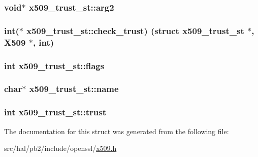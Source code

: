 \subsubsection[{\texorpdfstring{arg2}{arg2}}]{\setlength{\rightskip}{0pt plus 5cm}void$\ast$ x509\+\_\+trust\+\_\+st\+::arg2}\hypertarget{structx509__trust__st_af83753e80804cc408124be78954df1ef}{}\label{structx509__trust__st_af83753e80804cc408124be78954df1ef}
\subsubsection[{\texorpdfstring{check\+\_\+trust}{check_trust}}]{\setlength{\rightskip}{0pt plus 5cm}int($\ast$ x509\+\_\+trust\+\_\+st\+::check\+\_\+trust) (struct {\bf x509\+\_\+trust\+\_\+st} $\ast$, {\bf X509} $\ast$, int)}\hypertarget{structx509__trust__st_a416ceaadc539241699efb993fb2dc707}{}\label{structx509__trust__st_a416ceaadc539241699efb993fb2dc707}
\subsubsection[{\texorpdfstring{flags}{flags}}]{\setlength{\rightskip}{0pt plus 5cm}int x509\+\_\+trust\+\_\+st\+::flags}\hypertarget{structx509__trust__st_aee3ce09b9d6184cd66ad624b5689a676}{}\label{structx509__trust__st_aee3ce09b9d6184cd66ad624b5689a676}
\subsubsection[{\texorpdfstring{name}{name}}]{\setlength{\rightskip}{0pt plus 5cm}char$\ast$ x509\+\_\+trust\+\_\+st\+::name}\hypertarget{structx509__trust__st_a31ddd3f516ef8144ef40285f8f8f304d}{}\label{structx509__trust__st_a31ddd3f516ef8144ef40285f8f8f304d}
\subsubsection[{\texorpdfstring{trust}{trust}}]{\setlength{\rightskip}{0pt plus 5cm}int x509\+\_\+trust\+\_\+st\+::trust}\hypertarget{structx509__trust__st_a6840735427ee479d8796da9e838d6a77}{}\label{structx509__trust__st_a6840735427ee479d8796da9e838d6a77}


The documentation for this struct was generated from the following file\+:\begin{DoxyCompactItemize}
\item 
src/hal/pb2/include/openssl/\hyperlink{x509_8h}{x509.\+h}\end{DoxyCompactItemize}
